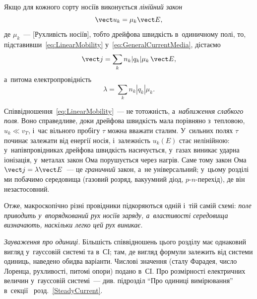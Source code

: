 Якщо для кожного сорту носіїв виконується \emph{лінійний закон}
\begin{equation}\label{eq:LinearMobility}
	\vect u_k = \mu_k \vect E,
\end{equation}
%
де $\mu_k$~--- [Рухливість носіїв], тобто дрейфова швидкість в~одиничному полі, то,
підставивши~\eqref{eq:LinearMobility} у~\eqref{eq:GeneralCurrentMedia}, дістаємо
\begin{equation}\label{eq:GeneralConductivityMedia}
	\vect j = \sum_k n_k |q_k|\mu_k\,\vect E,
\end{equation}
а~питома електропровідність
\begin{equation}\label{eq:GeneralConductivity}
	\lambda = \sum_k n_k |q_k|\mu_k.
\end{equation}

\begin{Attention}
	Співвідношення~\eqref{eq:LinearMobility}~--- не тотожність, а~\emph{наближення
	слабкого поля}. Воно справедливе, доки дрейфова швидкість мала порівняно з~тепловою,
	$u_k\ll v_T$, і~час вільного пробігу $\tau$ можна вважати сталим. У~сильних полях
	$\tau$ починає залежати від енергії носія, і~залежність $u_k(E)$ стає нелінійною:
	у~напівпровідниках дрейфова швидкість насичується, у~газах виникає ударна іонізація,
	у~металах закон Ома порушується через нагрів. Саме тому закон Ома $\vect
	j=\lambda\vect E$~--- це \emph{граничний} закон, а~не універсальний; у~цьому розділі
	ми побачимо середовища (газовий розряд, вакуумний діод, $p$-$n$-перехід), де він
	незастосовний.
\end{Attention}

Отже, макроскопічно різні провідники підкоряються одній і~тій самій схемі: \emph{поле
приводить у~впорядкований рух носіїв заряду, а~властивості середовища визначають,
наскільки легко цей рух виникає}.

\begin{Attention}
	\emph{Зауваження про одиниці.} Більшість співвідношень цього розділу має однаковий
	вигляд у~гауссовій системі та в~СІ; там, де вигляд формули залежить від системи
	одиниць, наведено обидва варіанти. Числові значення (сталу Фарадея, число Лоренца,
	рухливості, питомі опори) подано в~СІ. Про розмірності електричних величин у~гауссовій
	системі~--- див. підрозділ \enquote{Про одиниці вимірювання}
	в~секції~ розд.~\ref{SteadyCurrent}.
\end{Attention}


